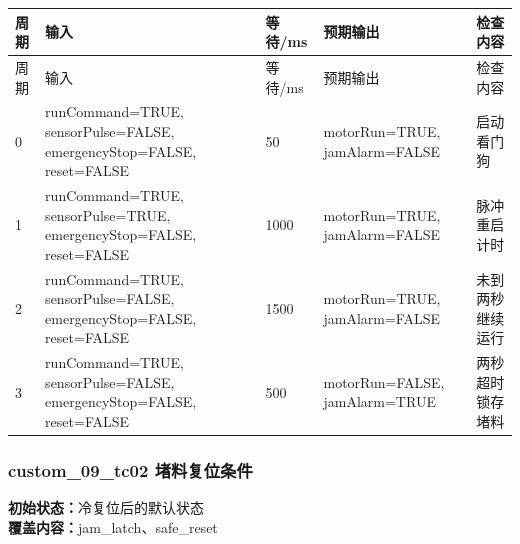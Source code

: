 \begin{longtable}{L{1.0cm}L{4.7cm}L{1.4cm}L{4.0cm}L{2.1cm}}

\toprule

周期 & 输入 & 等待/ms & 预期输出 & 检查内容\\

\midrule

\endfirsthead

\toprule

周期 & 输入 & 等待/ms & 预期输出 & 检查内容\\

\midrule

\endhead

0 & runCommand=TRUE, sensorPulse=FALSE, emergencyStop=FALSE, reset=FALSE & 50 & motorRun=TRUE, jamAlarm=FALSE & 启动看门狗\\

1 & runCommand=TRUE, sensorPulse=TRUE, emergencyStop=FALSE, reset=FALSE & 1000 & motorRun=TRUE, jamAlarm=FALSE & 脉冲重启计时\\

2 & runCommand=TRUE, sensorPulse=FALSE, emergencyStop=FALSE, reset=FALSE & 1500 & motorRun=TRUE, jamAlarm=FALSE & 未到两秒继续运行\\

3 & runCommand=TRUE, sensorPulse=FALSE, emergencyStop=FALSE, reset=FALSE & 500 & motorRun=FALSE, jamAlarm=TRUE & 两秒超时锁存堵料\\

\bottomrule

\end{longtable}

\subsubsection{{\ttfamily custom\_09\_tc02} 堵料复位条件}

\noindent\textbf{初始状态：}冷复位后的默认状态\\

\textbf{覆盖内容：}jam\_latch、safe\_reset

